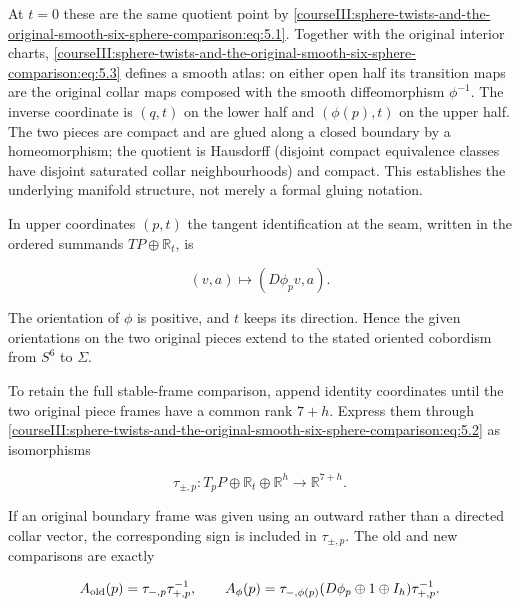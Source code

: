 At \(t=0\) these are the same quotient point by \eqref{courseIII:sphere-twists-and-the-original-smooth-six-sphere-comparison:eq:5.1}. Together with the original interior charts, \eqref{courseIII:sphere-twists-and-the-original-smooth-six-sphere-comparison:eq:5.3} defines a smooth atlas: on either open half its transition maps are the original collar maps composed with the smooth diffeomorphism \(\phi^{-1}\). The inverse coordinate is \((q,t)\) on the lower half and \((\phi(p),t)\) on the upper half. The two pieces are compact and are glued along a closed boundary by a homeomorphism; the quotient is Hausdorff (disjoint compact equivalence classes have disjoint saturated collar neighbourhoods) and compact. This establishes the underlying manifold structure, not merely a formal gluing notation.

In upper coordinates \((p,t)\) the tangent identification at the seam, written in the ordered summands \(TP\oplus\mathbb R_t\), is

\begin{equation}
(v,a)\longmapsto(D\phi_pv,a).
 \label{courseIII:sphere-twists-and-the-original-smooth-six-sphere-comparison:eq:5.4}
\end{equation}

The orientation of \(\phi\) is positive, and \(t\) keeps its direction. Hence the given orientations on the two original pieces extend to the stated oriented cobordism from \(S^6\) to \(\Sigma\).

To retain the full stable-frame comparison, append identity coordinates until the two original piece frames have a common rank \(7+h\). Express them through \eqref{courseIII:sphere-twists-and-the-original-smooth-six-sphere-comparison:eq:5.2} as isomorphisms

\begin{equation}
\tau_{\pm,p}:T_pP\oplus\mathbb R_t\oplus\mathbb R^h
                                    \longrightarrow\mathbb R^{7+h}.
 \label{courseIII:sphere-twists-and-the-original-smooth-six-sphere-comparison:eq:5.5}
\end{equation}

If an original boundary frame was given using an outward rather than a directed collar vector, the corresponding sign is included in \(\tau_{\pm,p}\). The old and new comparisons are exactly

\begin{equation}
A_{\rm old}(p)=\tau_{-,p}\tau_{+,p}^{-1},\qquad
 A_\phi(p)=\tau_{-,\phi(p)}
              (D\phi_p\oplus1\oplus I_h)\tau_{+,p}^{-1}.
 \label{courseIII:sphere-twists-and-the-original-smooth-six-sphere-comparison:eq:5.6}
\end{equation}

